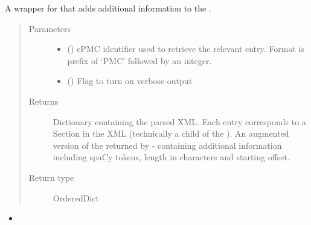 \documentclass[letterpaper,10pt,english]{sphinxmanual}
\begin{document}
\begin{fulllineitems}
\label{\detokenize{functions:pyresid.get_text}}
A wrapper for {\hyperref[\detokenize{functions:pyresid.get_sections_text}]{}} that adds additional information
to the .
\begin{quote}\begin{description}
\item[{Parameters}] \leavevmode\begin{itemize}
\item {} 
 () \textendash{} ePMC identifier used to retrieve the relevant entry. Format is prefix of ‘PMC’
followed by an integer.

\item {} 
 (\sphinxstyleliteralemphasis{\sphinxupquote{, }}\sphinxstyleliteralemphasis{\sphinxupquote{, }}) \textendash{} Flag to turn on verbose output

\end{itemize}

\item[{Returns}] \leavevmode
{} \textendash{} Dictionary containing the parsed XML. Each entry corresponds to a Section
in the XML (technically a child of the ). An augmented version of
the  returned by {\hyperref[\detokenize{functions:pyresid.get_sections_text}]{}} - containing
additional information including spaCy tokens, length in characters and
starting offset.

\item[{Return type}] \leavevmode
OrderedDict

\end{description}\end{quote}



\begin{itemize}
\item {} 
{\hyperref[\detokenize{functions:pyresid.get_sections_text}]{}}

\end{itemize}



\end{fulllineitems}
\end{document}
